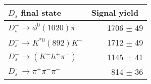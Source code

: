  \begin{tabular}{l r }
\hline\hline
$D_s$ final state  & Signal yield\ \\
\hline
$D_{s}^{-} \to \phi^{0}(1020)\pi^{-}$ & 1706 $\pm$ 49 \\
$D_{s}^{-}\to K^{*0}(892)K^{-}$ & 1712 $\pm$ 49 \\
$D_{s}^{-}\to (K^{-}h^{+}\pi^{-})$ & 1145 $\pm$ 41 \\
$D_{s}^{-}\to \pi^{+}\pi^{-}\pi^{-}$ & 814 $\pm$ 36 \\
\hline\hline
\end{tabular}
\label{table:signalYieldsDs}
